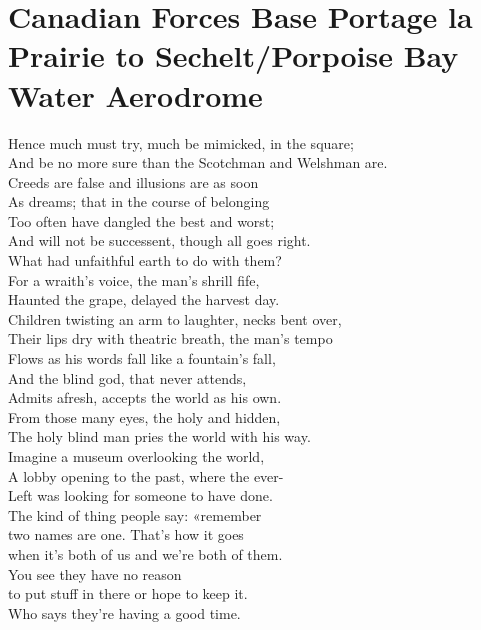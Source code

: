 \documentclass[smalldemyvopaper,11pt,twoside,onecolumn,openright,extrafontsizes]{memoir}
\begin{document}
\chapter{Canadian Forces Base Portage la Prairie to Sechelt/Porpoise Bay Water Aerodrome}
Hence much must try, much be mimicked, in the square;
\\And be no more sure than the Scotchman and Welshman are.
\\Creeds are false and illusions are as soon
\\As dreams; that in the course of belonging
\\Too often have dangled the best and worst;
\\And will not be successent, though all goes right.
\\What had unfaithful earth to do with them?
\\For a wraith's voice, the man's shrill fife,
\\Haunted the grape, delayed the harvest day.
\\Children twisting an arm to laughter, necks bent over,
\\Their lips dry with theatric breath, the man's tempo
\\Flows as his words fall like a fountain's fall,
\\And the blind god, that never attends,
\\Admits afresh, accepts the world as his own.
\\From those many eyes, the holy and hidden,
\\The holy blind man pries the world with his way.
\\Imagine a museum overlooking the world,
\\A lobby opening to the past, where the ever-
\\Left was looking for someone to have done.
\\The kind of thing people say: «remember
\\two names are one. That's how it goes
\\when it's both of us and we're both of them.
\\You see they have no reason
\\to put stuff in there or hope to keep it.
\\Who says they're having a good time.
\end{document}
